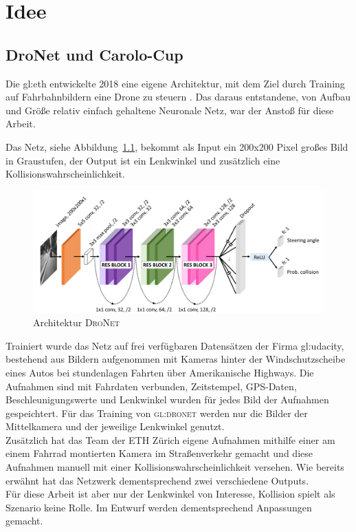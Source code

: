 %
\chapter{Idee}

\section{DroNet und Carolo-Cup}

Die \gls{gl:eth} entwickelte 2018 eine eigene Architektur, mit dem Ziel durch Training auf Fahrbahnbildern eine Drone zu steuern \cite{Loquercio_2018}. 
Das daraus entstandene, von Aufbau und Größe relativ einfach gehaltene Neuronale Netz, war der Anstoß für diese Arbeit. 

Das Netz, siehe Abbildung~\ref{img:DroNet}, bekommt als Input ein 200x200 Pixel großes Bild in Graustufen, der Output ist ein Lenkwinkel und zusätzlich eine Kollisionswahrscheinlichkeit.\\

\begin{figure}[h]
	\centering
	\includegraphics[scale=0.5]{figures/Architecture-DRONET.png}
	\caption{Architektur \textsc{DroNet}}
	\label{img:DroNet}
\end{figure}

Trainiert wurde das Netz auf frei verfügbaren Datensätzen der Firma \gls{gl:udacity}, bestehend aus Bildern aufgenommen mit Kameras hinter der Windschutzscheibe eines Autos bei stundenlagen Fahrten über Amerikanische Highways. Die Aufnahmen sind mit Fahrdaten verbunden, Zeitstempel, GPS-Daten, Beschleunigungswerte und Lenkwinkel wurden für jedes Bild der Aufnahmen gespeichtert. Für das Training von \textsc{\gls{gl:dronet}} werden nur die Bilder der Mittelkamera und der jeweilige Lenkwinkel genutzt.\\
Zusätzlich hat das Team der ETH Zürich eigene Aufnahmen mithilfe einer am einem Fahrrad montierten Kamera im Straßenverkehr gemacht und diese Aufnahmen manuell mit einer Kollisionswahrscheinlichkeit versehen. Wie bereits erwähnt hat das Netzwerk dementsprechend zwei verschiedene Outputs.\\
Für diese Arbeit ist aber nur der Lenkwinkel von Interesse, Kollision spielt als Szenario keine Rolle. Im Entwurf werden dementsprechend Anpassungen gemacht.

